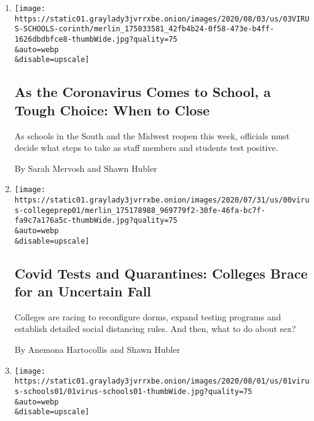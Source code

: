 \begin{enumerate}
\def\labelenumi{\arabic{enumi}.}
\item
  \href{/2020/08/03/us/school-closing-coronavirus.html}{}

  \texttt{[image: https://static01.graylady3jvrrxbe.onion/images/2020/08/03/us/03VIRUS-SCHOOLS-corinth/merlin\_175033581\_42fb4b24-0f58-473e-b4ff-1626dbdbfce8-thumbWide.jpg?quality=75\\\&auto=webp\\\&disable=upscale]}

  \hypertarget{as-the-coronavirus-comes-to-school-a-tough-choice-when-to-close}{%
  \subsection{As the Coronavirus Comes to School, a Tough Choice: When
  to
  Close}\label{as-the-coronavirus-comes-to-school-a-tough-choice-when-to-close}}

  As schools in the South and the Midwest reopen this week, officials
  must decide what steps to take as staff members and students test
  positive.

  By Sarah Mervosh and Shawn Hubler
\item
  \href{/2020/08/02/us/covid-college-reopening.html}{}

  \texttt{[image: https://static01.graylady3jvrrxbe.onion/images/2020/07/31/us/00virus-collegeprep01/merlin\_175178988\_969779f2-30fe-46fa-bc7f-fa9c7a176a5c-thumbWide.jpg?quality=75\\\&auto=webp\\\&disable=upscale]}

  \hypertarget{covid-tests-and-quarantines-colleges-brace-for-an-uncertain-fall}{%
  \subsection{Covid Tests and Quarantines: Colleges Brace for an
  Uncertain
  Fall}\label{covid-tests-and-quarantines-colleges-brace-for-an-uncertain-fall}}

  Colleges are racing to reconfigure dorms, expand testing programs and
  establish detailed social distancing rules. And then, what to do about
  sex?

  By Anemona Hartocollis and Shawn Hubler
\item
  \href{/2020/08/01/us/schools-reopening-indiana-coronavirus.html}{}

  \texttt{[image: https://static01.graylady3jvrrxbe.onion/images/2020/08/01/us/01virus-schools01/01virus-schools01-thumbWide.jpg?quality=75\\\&auto=webp\\\&disable=upscale]}

  \hypertarget{a-school-reopens-and-the-coronavirus-creeps-in}{%
}
\end{enumerate}
